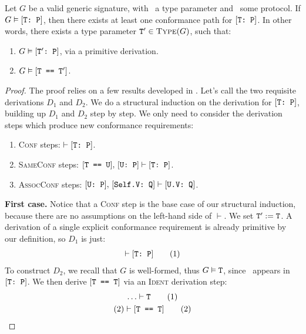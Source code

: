 \documentclass[../generics]{subfiles}
\begin{document}
\begin{theorem}\label{conformance paths theorem} Let $G$ be a valid generic signature, with \tT\ a type parameter and \tP\ some protocol. If $G\vDash[\texttt{T:~P}]$, then there exists at least one conformance path for $[\texttt{T:~P}]$. In other words, there exists a type parameter $\texttt{T}^\prime\in\textsc{Type}({G})$, such that:
\begin{enumerate}
\item $G\vDash[\texttt{$\texttt{T}^\prime$:~P}]$, via a primitive derivation.
\item $G\vDash[\texttt{T == $\texttt{T}^\prime$}]$.
\end{enumerate}
\end{theorem}
\begin{proof}
The proof relies on a few results developed in . Let's call the two requisite derivations $D_1$ and $D_2$. We do a structural induction on the derivation for $[\texttt{T:~P}]$, building up $D_1$ and $D_2$ step by step. We only need to consider the derivation steps which produce new conformance requirements:
\begin{enumerate}
\item {}\textsc{Conf} steps: $\vdash[\texttt{T:~P}]$.
\item {}\textsc{SameConf} steps: $[\texttt{T == U}],\,[\texttt{U:~P}]\vdash[\texttt{T:~P}]$.
\item {}\textsc{AssocConf} steps: $[\texttt{U:~P}],\,[\texttt{Self.V:~Q}]\vdash[\texttt{U.V:~Q}]$.
\end{enumerate}

\noindent \textbf{First case.} Notice that a \textsc{Conf} step is the base case of our structural induction, because there are no assumptions on the left-hand side of $\vdash$. We set $\texttt{T}^\prime := \texttt{T}$. A derivation of a single explicit conformance requirement is already primitive by our definition, so $D_1$ is just:
\begin{gather*}
\vdash[\texttt{T:~P}]\tag{1}
\end{gather*}
To construct $D_2$, we recall that $G$ is well-formed, thus $G\vDash\texttt{T}$, since \tT\ appears in $[\texttt{T:~P}]$. We then derive $[\texttt{T == T}]$ via an \textsc{Ident} derivation step:
\begin{gather*}
\ldots\vdash\texttt{T}\tag{1}\\
(2)\vdash[\texttt{T == T}]\tag{2}
\end{gather*}


\end{proof}
\end{document}
